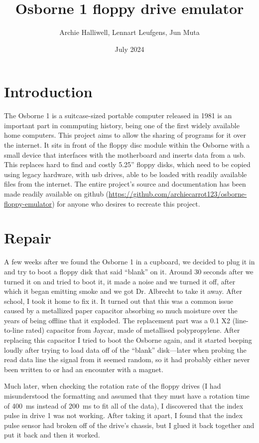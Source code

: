 \documentclass[a4paper]{article}
\begin{document}
\title{Osborne 1 floppy drive emulator}
\date{July 2024}
\author{Archie Halliwell, Lennart Leufgens, Jun Muta}
\maketitle

\section{Introduction}

The Osborne 1 is a suitcase-sized portable computer released in 1981
is an important part in commputing history, being one of the first
widely available home computers. This project aims to allow the
sharing of programs for it over the internet. It sits in front of the
floppy disc module within the Osborne with a small device that
interfaces with the motherboard and inserts data from a usb. This
replaces hard to find and costly 5.25'' floppy disks, which need to be
copied using legacy hardware, with usb drives, able to be loaded with
readily available files from the internet. The entire project's source
and documentation has been made readily available on github
(\url{https://github.com/archiecarrot123/osborne-floppy-emulator}) for
anyone who desires to recreate this project.

\section{Repair}

A few weeks after we found the Osborne 1 in a cupboard, we decided to
plug it in and try to boot a floppy disk that said ``blank'' on
it. Around 30 seconds after we turned it on and tried to boot it, it
made a noise and we turned it off, after which it began emitting smoke
and we got Dr. Albrecht to take it away. After school, I took it home
to fix it. It turned out that this was a common issue caused by a
metallized paper capacitor absorbing so much moisture over the years
of being offline that it exploded. The replacement part was a
\qty{0.1}{\uF} X2 (line-to-line rated) capacitor from Jaycar, made of
metallised polypropylene. After replacing this capacitor I tried to
boot the Osborne again, and it started beeping loudly after trying to
load data off of the ``blank'' disk---later when probing the read data
line the signal from it seemed random, so it had probably either never
been written to or had an encounter with a magnet.

Much later, when checking the rotation rate of the floppy drives (I
had misunderstood the formatting and assumed that they must have a
rotation time of \qty{400}{\ms} instead of \qty{200}{\ms} to fit all
of the data), I discovered that the index pulse in drive 1 was not
working. After taking it apart, I found that the index pulse sensor
had broken off of the drive's chassis, but I glued it back together
and put it back and
then it worked.
\end{document}
